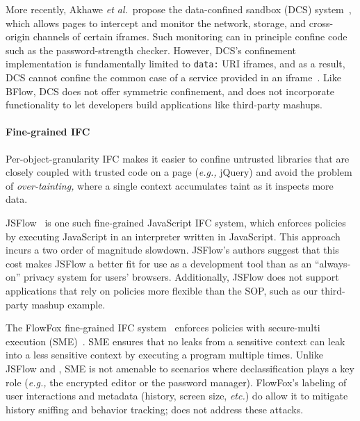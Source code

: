 More recently, Akhawe \emph{et al.}~propose the data-confined sandbox
(DCS) system~\cite{Akhawe2013}, which allows pages to intercept and
monitor the network, storage, and cross-origin channels of certain
iframes.
%
Such monitoring can in principle confine code such as the
password-strength checker.
%
However, DCS's confinement implementation is fundamentally limited to
\verb|data:| URI iframes, and as a result, DCS cannot confine the
common case of a service provided in an iframe~\cite{postman}.
%
Like BFlow, DCS does not offer symmetric confinement, and does
not incorporate functionality to let developers build
applications like third-party mashups.
%

\paragraph{Fine-grained IFC}
Per-object-granularity IFC makes
it easier to confine untrusted libraries that are closely coupled with trusted
code on a page (\emph{e.g.,} jQuery) and avoid the problem of
\emph{over-tainting,}
where a single context accumulates taint as it inspects more data.

JSFlow~\cite{JSFlow} is one such fine-grained JavaScript IFC system, which
enforces policies by executing JavaScript in an interpreter written in
JavaScript.
%
This approach incurs a two order of magnitude slowdown. JSFlow's
authors suggest that this cost makes JSFlow a better fit for use as a
development tool than as an ``always-on'' privacy system for users'
browsers.
%
Additionally, JSFlow does not support applications that rely on policies
more flexible than the SOP, such as our third-party mashup example.

The FlowFox fine-grained IFC system~\cite{DeGroef:2012} enforces
policies with secure-multi execution (SME)~\cite{Devriese:2010}. SME
ensures that no leaks from a sensitive context can leak into a less
sensitive context by executing a program multiple times.
%
Unlike JSFlow and \sys{}, SME is not amenable to
scenarios where declassification plays a key role (\emph{e.g.,} the encrypted
editor or the password manager).
%
FlowFox's labeling of user interactions and metadata (history, screen
size, \emph{etc.}) do allow it to mitigate history sniffing and
behavior tracking; \sys{} does not address these attacks.

